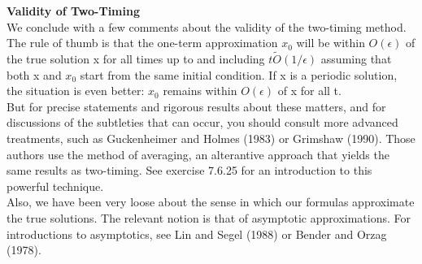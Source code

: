 \documentclass{article}
\newcommand\tab[1][1cm]{\hspace*{#1}}
\begin{document}
\textbf {Validity of Two-Timing} \\ \tab
We conclude with a few comments about the validity of the two-timing method. The rule of thumb is that the one-term approximation $x_{0}$ will be within $O(\epsilon)$ of the true solution x for all times up to and including $t \tilde O(1/\epsilon)$ assuming that both x and $x_{0}$ start from the same initial condition. If x is a periodic solution, the situation is even better: $x_{0}$ remains within $O(\epsilon)$ of x for all t. \\ \tab
But for precise statements and rigorous results about these matters, and for discussions of the subtleties that can occur, you should consult more advanced treatments, such as Guckenheimer and Holmes (1983) or Grimshaw (1990). Those authors use the method of averaging, an alterantive approach that yields the same results as two-timing. See exercise 7.6.25 for an introduction to this powerful technique. \\ \tab
Also, we have been very loose about the sense in which our formulas approximate the true solutions. The relevant notion is that of asymptotic approximations. For introductions to asymptotics, see Lin and Segel (1988) or Bender and Orzag (1978).
\end{document}
